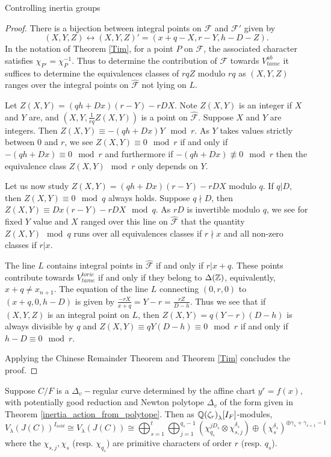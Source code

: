 \documentclass[11pt,a4paper]{article}
\newcommand{\Dv}{\Delta_v}
\newcommand{\D}{\Delta}
\newcommand{\Qr}{{\QQ(\zeta_r)}}
\newcommand{\F}{\mathcal{F}}
\begin{document}
\begin{section}{Controlling inertia groups}
\begin{proof}
There is a bijection between integral points on $\F$ and $\F'$ given by $$(X,Y,Z) \leftrightarrow (X,Y,Z)' = (x+q - X, r-Y,h-D - Z).$$ In the notation of Theorem \ref{Tim}, for a point $P$ on $\F$, the associated character satisfies  $\chi_{P'} = \chi_{P}^{-1}$.
Thus to determine the contribution of $\F$ towards $V^{ab}_{tame}$ it suffices to determine the equivalences classes of $rqZ$ modulo $rq$ as $(X,Y,Z)$ ranges over the integral points on $\hat{\F}$ not lying on $L$.



Let $Z(X,Y) = (qh+Dx)(r-Y) - rDX$.
Note $Z(X,Y)$ is an integer if $X$ and $Y$ are, and $(X,Y, \frac{1}{rq} Z(X,Y))$ is a point on $\hat{\F}$.
Suppose $X$ and $Y$ are integers.
Then $Z(X,Y) \equiv -(qh+Dx)Y \mod{r}$.
As $Y$ takes values strictly between $0$ and $r$, we see $Z(X,Y) \equiv 0 \mod{r}$ if and only if $-(qh+Dx) \equiv 0 \mod{r}$ and furthermore if $-(qh+Dx) \not \equiv 0 \mod{r}$ then the equivalence class $Z(X,Y) \mod{r}$ only depends on $Y$.

Let us now study $Z(X,Y) = (qh+Dx)(r-Y) - rDX$ modulo $q$. If $q|D$, then $Z(X,Y) \equiv 0 \mod{q}$ always holds.
Suppose $q\nmid D$, then $Z(X,Y) \equiv Dx(r-Y) - rDX \mod{q}$.
As $rD$ is invertible modulo $q$, we see for fixed $Y$ value and $X$ ranged over this line on $\hat{\F}$ that the quantity $Z(X,Y) \mod{q}$ runs over all equivalences classes if $r\nmid x$ and all non-zero classes if $r| x$.

The line $L$ contains integral points in $\hat{\F}$ if and only if $r|x+q$.
These points contribute towards $V^{toric}_{tame}$ if and only if they belong to $\D(\ZZ)$, equivalently, $x+q \neq x_{n+1}$.
The equation of the line $L$ connecting $(0,r,0)$ to $(x+q,0,h-D)$ is given by $\frac{-rX}{x+q}=Y-r=\frac{rZ}{D-h}$.
Thus we see that if $(X,Y,Z)$ is an integral point on $L$, then $Z(X,Y) = q(Y-r)(D-h)$ is always divisible by $q$ and  $Z(X,Y) \equiv qY(D-h) \equiv 0 \mod{r}$ if and only if $h-D \equiv 0 \mod{r}$.

Applying the Chinese Remainder Theorem and Theorem \ref{Tim} concludes the proof.
\end{proof}



\begin{corollary}
\label{cor_PGR_inertia_description}
Suppose $C/F$  is a $\Delta_v-$regular curve determined by the affine chart $y^r=f(x)$, with potentially good reduction and Newton polytope $\Dv$ of the form given in Theorem \ref{inertia_action_from_polytope}. Then as $\Qr_\lambda [I_F]$-modules, 
$$V_\lambda(J(C))^{I_{wild}}   \cong V_\lambda(J(C))   \cong \bigoplus^t_{s=1}  \bigoplus^{q_s-1}_{j=1}(\chi_{q_s}^{j D_s} \otimes \chi_{s,j}^{\delta_s})   \oplus (\chi_s^{\delta_s})^{\oplus \gamma_s + \gamma_{s+1} -1} $$
where the $\chi_{s,j}, \chi_s$ (resp. $\chi_{q_s}$) are primitive characters of order $r$ (resp. $q_s$). 


\end{corollary}
\end{section}
\end{document}
